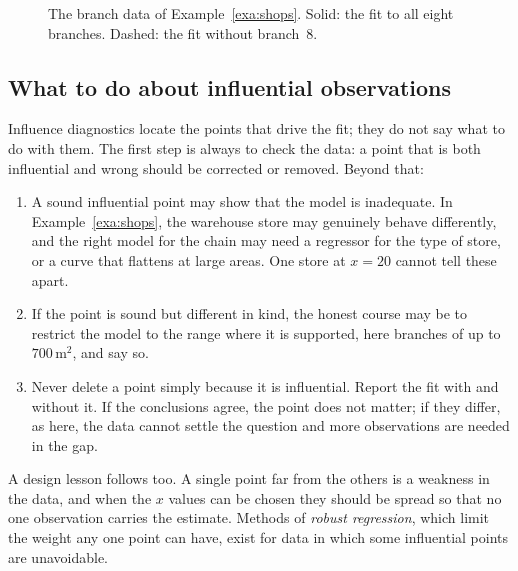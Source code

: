 \documentclass[11pt,a4paper]{article}
\numberwithin{equation}{section}
\theoremstyle{definition}
\begin{document}
\begin{figure}[H]
\centering
{}
\caption{The branch data of Example~\ref{exa:shops}. Solid: the fit to all eight branches.
Dashed: the fit without branch~8.}
\label{fig:shops}
\end{figure}

\subsection{What to do about influential observations}
Influence diagnostics locate the points that drive the fit; they do not say what to do with
them. The first step is always to check the data: a point that is both influential and wrong
should be corrected or removed. Beyond that:
\begin{enumerate}[label=(\roman*)]
\item A sound influential point may show that the model is inadequate. In
Example~\ref{exa:shops}, the warehouse store may genuinely behave differently, and the
right model for the chain may need a regressor for the type of store, or a curve that
flattens at large areas. One store at $x = 20$ cannot tell these apart.
\item If the point is sound but different in kind, the honest course may be to restrict the
model to the range where it is supported, here branches of up to $700$\,m$^2$, and say so.
\item Never delete a point simply because it is influential. Report the fit with and without
it. If the conclusions agree, the point does not matter; if they differ, as here, the
data cannot settle the question and more observations are needed in the gap.
\end{enumerate}
A design lesson follows too. A single point far from the others is a weakness in the data, and
when the $x$ values can be chosen they should be spread so that no one observation carries
the estimate. Methods of \emph{robust regression}, which limit the weight any one point can
have, exist for data in which some influential points are unavoidable.
\end{document}
